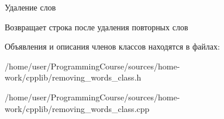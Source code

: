 Удаление слов 

\begin{DoxyReturn}{Возвращает}
строка после удаления повторных слов 
\end{DoxyReturn}


Объявления и описания членов классов находятся в файлах\+:\begin{DoxyCompactItemize}
\item 
/home/user/\+Programming\+Course/sources/home-\/work/cpplib/removing\+\_\+words\+\_\+class.\+h\item 
/home/user/\+Programming\+Course/sources/home-\/work/cpplib/removing\+\_\+words\+\_\+class.\+cpp\end{DoxyCompactItemize}
